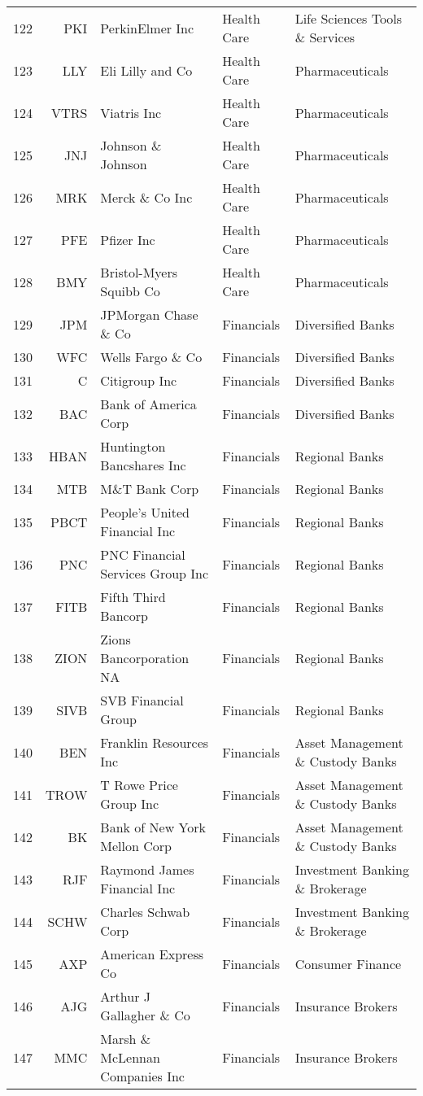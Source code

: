 \documentclass[aps, pra, groupedaddress, showkeys, twocolumn, floatfix, 10pt]{revtex4-2}
\begin{document}
{\begin{longtable}{rrllp{4cm}}
122&PKI&PerkinElmer Inc&Health Care&Life Sciences Tools \& Services \\
123&LLY&Eli Lilly and Co&Health Care&Pharmaceuticals \\
124&VTRS&Viatris Inc&Health Care&Pharmaceuticals \\
125&JNJ&Johnson \& Johnson&Health Care&Pharmaceuticals \\
126&MRK&Merck \& Co Inc&Health Care&Pharmaceuticals \\
127&PFE&Pfizer Inc&Health Care&Pharmaceuticals \\
128&BMY&Bristol-Myers Squibb Co&Health Care&Pharmaceuticals \\
129&JPM&JPMorgan Chase \& Co&Financials&Diversified Banks \\
130&WFC&Wells Fargo \& Co&Financials&Diversified Banks \\
131&C&Citigroup Inc&Financials&Diversified Banks \\
132&BAC&Bank of America Corp&Financials&Diversified Banks \\
133&HBAN&Huntington Bancshares Inc&Financials&Regional Banks \\
134&MTB&M\&T Bank Corp&Financials&Regional Banks \\
135&PBCT&People's United Financial Inc&Financials&Regional Banks \\
136&PNC&PNC Financial Services Group Inc&Financials&Regional Banks \\
137&FITB&Fifth Third Bancorp&Financials&Regional Banks \\
138&ZION&Zions Bancorporation NA&Financials&Regional Banks \\
139&SIVB&SVB Financial Group&Financials&Regional Banks \\
140&BEN&Franklin Resources Inc&Financials&Asset Management \& Custody Banks \\
141&TROW&T Rowe Price Group Inc&Financials&Asset Management \& Custody Banks \\
142&BK&Bank of New York Mellon Corp&Financials&Asset Management \& Custody Banks \\
143&RJF&Raymond James Financial Inc&Financials&Investment Banking \& Brokerage \\
144&SCHW&Charles Schwab Corp&Financials&Investment Banking \& Brokerage \\
145&AXP&American Express Co&Financials&Consumer Finance \\
146&AJG&Arthur J Gallagher \& Co&Financials&Insurance Brokers \\
147&MMC&Marsh \& McLennan Companies Inc&Financials&Insurance Brokers \\

\end{longtable}}
\end{document}
